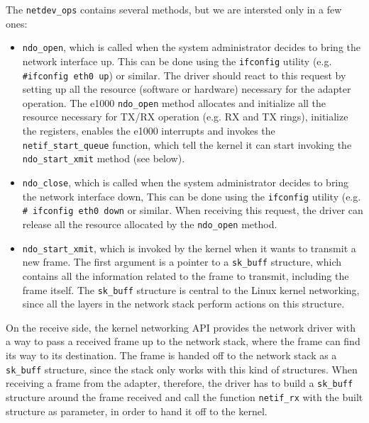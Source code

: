 The \texttt{netdev\_ops} contains several methods, but we are intersted only in a few ones:
\begin{itemize}
    \item \texttt{ndo\_open}, which is called when the system administrator decides to bring the network interface up. This can be done
	  using the \texttt{ifconfig} utility (e.g. \texttt{\#ifconfig eth0 up}) or similar. The driver should react to this request by
	  setting up all the resource (software or hardware) necessary for the adapter operation. The e1000 \texttt{ndo\_open} method
	  allocates and initialize all the resource necessary for TX/RX operation (e.g. RX and TX rings), initialize the registers,
	  enables the e1000 interrupts and invokes the \texttt{netif\_start\_queue} function, which tell the kernel it can start invoking
	  the \texttt{ndo\_start\_xmit} method (see below).
	  
    \item \texttt{ndo\_close}, which is called when the system administrator decides to bring the network interface down, This can be
	  done using the \texttt{ifconfig} utility (e.g. \texttt{\# ifconfig eth0 down} or similar. When receiving this request,
	  the driver can release all the resource allocated by the \texttt{ndo\_open} method.
	  
    \item \texttt{ndo\_start\_xmit}, which is invoked by the kernel when it wants to transmit a new frame. The first argument is
	  a pointer to a \texttt{sk\_buff} structure, which contains all the information related to the frame to transmit, including
	  the frame itself. The \texttt{sk\_buff} structure is central to the Linux kernel networking, since all the layers in the 
	  network stack perform actions on this structure.
	 
\end{itemize}

\vspace{0.5cm}

On the receive side, the kernel networking API provides the network driver with a way to pass a received frame up to the network
stack, where the frame can find its way to its destination.
The frame is handed off to the network stack as a \texttt{sk\_buff} structure, since the stack only works with this kind of structures.
When receiving a frame from the adapter, therefore, the driver has to build a \texttt{sk\_buff} structure around the frame received
and call the function \texttt{netif\_rx} with the built structure as parameter, in order to hand it off to the kernel.

